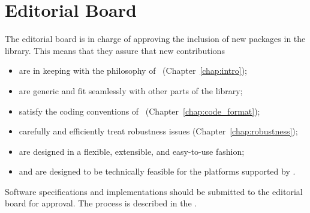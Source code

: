 
\chapter{Editorial Board\label{chap:submission}\label{sec:editorial_board}}


The editorial board is in charge of approving the inclusion of new packages
in the library.  This means that they assure that new contributions
\begin{itemize}
   \item are in keeping with the philosophy of \cgal\ (Chapter~\ref{chap:intro});
   \item are generic and fit seamlessly with other parts of the library;
   \item satisfy the coding conventions of \cgal\ (Chapter~\ref{chap:code_format});
   \item carefully and efficiently treat robustness issues
         (Chapter~\ref{chap:robustness});
   \item are designed in a flexible, extensible, and easy-to-use fashion;
   \item and are designed to be technically feasible for the platforms
         supported by \cgal.
\end{itemize}

Software specifications and implementations should be submitted to the
editorial board for approval. The process is described in the 
. 


